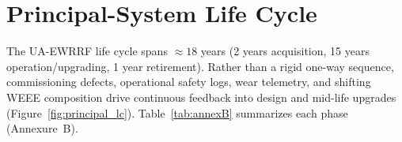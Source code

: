 \section{Principal-System Life Cycle}
\label{sec:B}

The UA-EWRRF life cycle spans $\approx 18$ years (2 years acquisition, 15 years operation/upgrading, 1 year retirement). Rather than a rigid one-way sequence, commissioning defects, operational safety logs, wear telemetry, and shifting WEEE composition drive continuous feedback into design and mid-life upgrades (Figure~\ref{fig:principal_lc}). Table~\ref{tab:annexB} summarizes each phase (Annexure~B).



